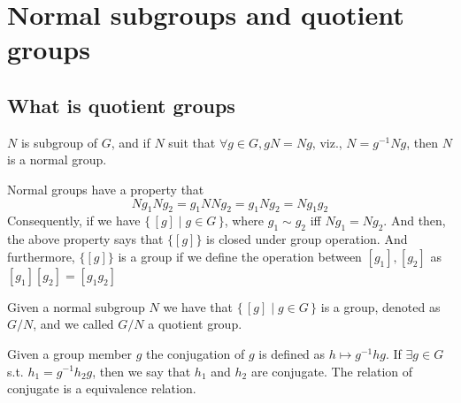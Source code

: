 \documentclass[../main.tex]{subfiles}
\begin{document}
\chapter{Normal subgroups and quotient groups}
\section{What is quotient groups}
\begin{definition}\label{def:Normal subgroups}
	\(N\) is subgroup of \(G\), and if \(N\) suit that \(\forall g \in G, g N = N g\), viz., \( N = g ^{-1} N g\),
	then \(N\) is a normal group. 
\end{definition}
Normal groups have a property that 
\[
	N g_1 N g_2 = g_1 N N g_2  = g_1 N g_2 = N g_1 g_2
\]
Consequently, if we have \( \{ \, [g] \mid g \in G \,\} \), where \(g_1 \sim g_2\) iff \( N g_1 = N g_2\). And then, 
the above property says that \( \{ [g]\}\) is closed under group operation. And furthermore, \(\{ [g]\}\) is a group if we define the operation between \( [ g_{1}] , [g _{2}]\) as \( [g _{1} ] [g_{2}] = [g _{1} g _{2}]\) 
\begin{definition}\label{def:Quotient groups}
	Given a normal subgroup \(N\) we have that \(\{ \, [g] \mid g \in G \,\}\)  is a group, denoted as 
	\(G / N\), and we called \(G / N\) a quotient group.
\end{definition}
\begin{definition}[Conjugate]\label{def:Conjugate}
	Given a group member \(g\) the conjugation of \(g\) is defined as \( h \mapsto g ^{-1} h g\). If \(\exists g \in G\)
	s.t. \(h_1 = g ^{-1} h_2 g \), then we say that \(h_1\) and \(h_2\) are conjugate. The relation of conjugate is 
	a equivalence relation.
\end{definition}
\end{document}
